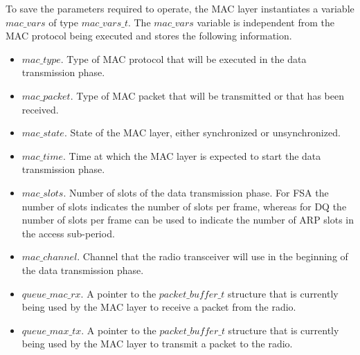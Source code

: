 To save the parameters required to operate, the MAC layer instantiates a variable $mac\_vars$ of type $mac\_vars\_t$. The $mac\_vars$ variable is independent from the MAC protocol being executed and stores the following information.
\begin{itemize}
\item $mac\_type$. Type of MAC protocol that will be executed in the data transmission phase.
\item $mac\_packet$. Type of MAC packet that will be transmitted or that has been received.
\item $mac\_state$. State of the MAC layer, either synchronized or unsynchronized.
\item $mac\_time$. Time at which the MAC layer is expected to start the data transmission phase. 
\item $mac\_slots$. Number of slots of the data transmission phase. For FSA the number of slots indicates the number of slots per frame, whereas for DQ the number of slots per frame can be used to indicate the number of ARP slots in the access sub-period.
\item $mac\_channel$. Channel that the radio transceiver will use in the beginning of the data transmission phase.
\item $queue\_mac\_rx$. A pointer to the $packet\_buffer\_t$ structure that is currently being used by the MAC layer to receive a packet from the radio.
\item $queue\_max\_tx$. A pointer to the $packet\_buffer\_t$ structure that is currently being used by the MAC layer to transmit a packet to the radio.
\end{itemize}

